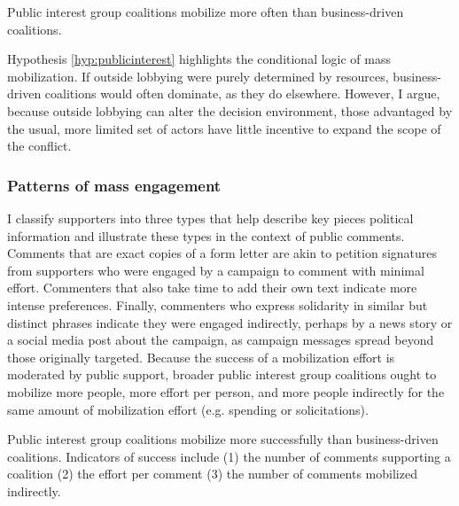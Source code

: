 \begin{subhyp}
\begin{hyp} \label{hyp:publicinterest}
Public interest group coalitions mobilize more often than business-driven coalitions.
\end{hyp}

Hypothesis \ref{hyp:publicinterest} highlights the conditional logic of mass mobilization. If outside lobbying were purely determined by resources, business-driven coalitions would often dominate, as they do elsewhere. However, I argue, because outside lobbying can alter the decision environment, those advantaged by the usual, more limited set of actors have little incentive to expand the scope of the conflict.








\subsubsection{Patterns of mass engagement} I classify supporters into three types that help describe key pieces political information and illustrate these types in the context of public comments. Comments that are exact copies of a form letter are akin to petition signatures from supporters who were engaged by a campaign to comment with minimal effort. Commenters that also take time to add their own text indicate more intense preferences. Finally, commenters who express solidarity in similar but distinct phrases indicate they were engaged indirectly, perhaps by a news story or a social media post about the campaign, 
as campaign messages spread beyond those originally targeted. Because the success of a mobilization effort is moderated by public support, broader public interest group coalitions ought to mobilize more people, more effort per person, and more people indirectly for the same amount of mobilization effort (e.g. spending or solicitations).  

\begin{hyp}
Public interest group coalitions mobilize more successfully than business-driven coalitions. Indicators of success include (1) the number of comments supporting a coalition (2) the effort per comment (3) the number of comments mobilized indirectly. 
\end{hyp}

\end{subhyp}

